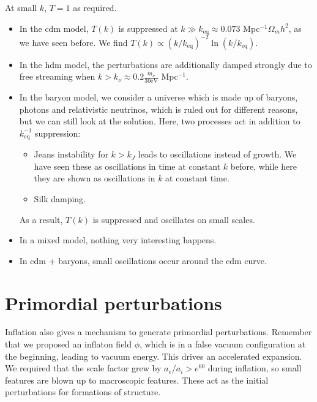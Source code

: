 At small $k$, $T = 1$ as required.
\begin{itemize}
	\item In the \ac{cdm} model, $T(k)$ is suppressed at $k \gg k_\text{eq} \approx 0.073$ Mpc$^{-1}\Omega_m h^2$, as we have seen before. We find $T(k) \propto (k/k_\text{eq})^{-2} \ln(k/k_\text{eq})$.
	\item In the \ac{hdm} model, the perturbations are additionally damped strongly due to free streaming when $k > k_\nu \approx 0.2 \frac{m_\nu}{30 \text{eV}}$ Mpc$^{-1}$.
	\item In the baryon model, we consider a universe which is made up of baryons, photons and relativistic neutrinos, which is ruled out for different reasons, but we can still look at the solution. Here, two processes act in addition to $k_\text{eq}^{-1}$ suppression:
	\begin{itemize}
		\item Jeans instability for $k > k_J$ leads to oscillations instead of growth. We have seen these as oscillations in time at constant $k$ before, while here they are shown as oscillations in $k$ at constant time.
		\item Silk damping.
	\end{itemize}
	As a result, $T(k)$ is suppressed and oscillates on small scales.
	\item In a mixed model, nothing very interesting happens.
	\item In \ac{cdm} + baryons, small oscillations occur around the \ac{cdm} curve.
\end{itemize}



\section{Primordial perturbations}
Inflation also gives a mechanism to generate primordial perturbations. Remember that we proposed an inflaton field $\phi$, which is in a false vacuum configuration at the beginning, leading to vacuum energy. This drives an accelerated expansion. We required that the scale factor grew by $a_e/a_i > e^{60}$ during inflation, so small features are blown up to macroscopic features. These act as the initial perturbations for formations of structure.

